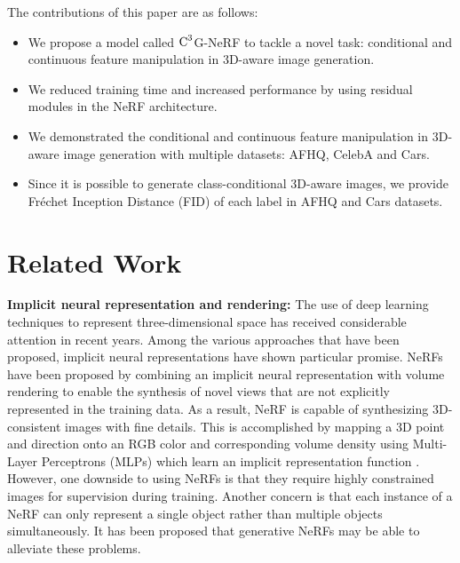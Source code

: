 \documentclass[nohyperref]{article}
\theoremstyle{plain}
\theoremstyle{definition}
\theoremstyle{remark}
\begin{document}
The contributions of this paper are as follows: 


\begin{itemize}
\item We propose a model called $\textnormal{C}^{3}$G-NeRF to tackle a novel task: conditional and continuous feature manipulation in 3D-aware image generation. 
\item We reduced training time and increased performance by using residual modules in the NeRF architecture. 
\item We demonstrated the conditional and continuous feature manipulation in 3D-aware image generation with multiple datasets: AFHQ, CelebA and Cars. 
\item Since it is possible to generate class-conditional 3D-aware images, we provide Fréchet Inception Distance (FID) of each label in AFHQ and Cars datasets. 
\end{itemize}

\section{Related Work}
\label{related_work}
\textbf{Implicit neural representation and rendering:} The use of deep learning techniques \cite{lecun2015deep} to represent three-dimensional space has received considerable attention in recent years. Among the various approaches that have been proposed, implicit neural representations \cite{sitzmann2019scene, tulsiani2020implicit, rajeswar2020pix2shape} have shown particular promise. NeRFs have been proposed by combining an implicit neural representation with volume rendering \cite{drebin1988volume} to enable the synthesis of novel views that are not explicitly represented in the training data. As a result, NeRF is capable of synthesizing 3D-consistent images with fine details. This is accomplished by mapping a 3D point and direction onto an RGB color and corresponding volume density using Multi-Layer Perceptrons (MLPs) \cite{pinkus1999approximation} which learn an implicit representation function \cite{mescheder2019occupancy, chabra2020deep, yariv2020multiview}. However, one downside to using NeRFs is that they require highly constrained images for supervision during training. Another concern is that each instance of a NeRF can only represent a single object rather than multiple objects simultaneously. It has been proposed that generative NeRFs may be able to alleviate these problems.
\end{document}
